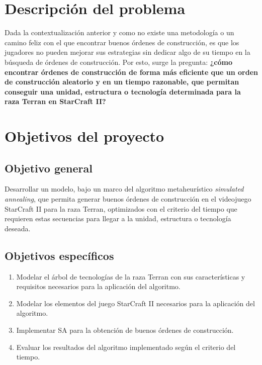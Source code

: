 \section{Descripci\'on del problema}
\label{intro:problema}
Dada la contextualización anterior y como no existe una metodología o un camino feliz con el que encontrar buenos órdenes de construcción, es que los jugadores no pueden mejorar sus estrategias sin dedicar algo de su tiempo en la búsqueda de órdenes de construcción. Por esto, surge la pregunta: \textbf{¿cómo encontrar órdenes de construcción de forma más eficiente que un orden de construcción aleatorio y en un tiempo razonable, que permitan conseguir una unidad, estructura o tecnología determinada para la raza Terran en StarCraft II?}

\section{Objetivos del proyecto}
\label{intro:objetivos}

\subsection{Objetivo general}

Desarrollar un modelo, bajo un marco del algoritmo metaheurístico \textit{simulated annealing}, que permita generar buenos órdenes de construcción en el videojuego StarCraft II para la raza Terran, optimizados con el criterio del tiempo que requieren estas secuencias para llegar a la unidad, estructura o tecnología deseada.

\subsection{Objetivos específicos}

\begin{enumerate}
\item Modelar el árbol de tecnologías de la raza Terran con sus características y requisitos necesarios para la aplicación del algoritmo.

\item Modelar los elementos del juego StarCraft II necesarios para la aplicación del algoritmo.

\item Implementar SA para la obtención de buenos órdenes de construcción.

\item Evaluar los resultados del algoritmo implementado según el criterio del tiempo.
\end{enumerate}

